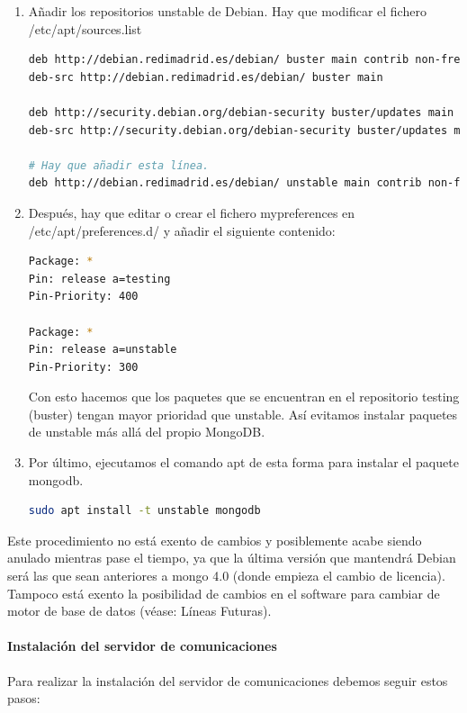 \documentclass[spanish,12pt, a4paper, twoside]{paper}
\begin{document}
\begin{enumerate}
\item Añadir los repositorios unstable de Debian. Hay que modificar el fichero /etc/apt/sources.list
\begin{lstlisting}[language=sh]
deb http://debian.redimadrid.es/debian/ buster main contrib non-free
deb-src http://debian.redimadrid.es/debian/ buster main

deb http://security.debian.org/debian-security buster/updates main
deb-src http://security.debian.org/debian-security buster/updates main

# Hay que añadir esta línea.
deb http://debian.redimadrid.es/debian/ unstable main contrib non-free
\end{lstlisting}

\item Después, hay que editar o crear el fichero mypreferences en /etc/apt/preferences.d/ y añadir el siguiente contenido:
\begin{lstlisting}[language=sh]
Package: *
Pin: release a=testing
Pin-Priority: 400

Package: *
Pin: release a=unstable
Pin-Priority: 300
\end{lstlisting}

Con esto hacemos que los paquetes que se encuentran en el repositorio testing (buster) tengan mayor prioridad que unstable. Así evitamos instalar paquetes de unstable más allá del propio MongoDB.

\item Por último, ejecutamos el comando apt de esta forma para instalar el paquete mongodb.
\begin{lstlisting}[language=sh]
sudo apt install -t unstable mongodb
\end{lstlisting}
\end{enumerate}

Este procedimiento no está exento de cambios y posiblemente acabe siendo anulado mientras pase el tiempo, ya que la última versión que mantendrá Debian será las que sean anteriores a mongo 4.0 (donde empieza el cambio de licencia). Tampoco está exento la posibilidad de cambios en el software para cambiar de motor de base de datos (véase: Líneas Futuras).

\paragraph{Instalación del servidor de comunicaciones}

Para realizar la instalación del servidor de comunicaciones debemos seguir estos pasos:
\end{document}
